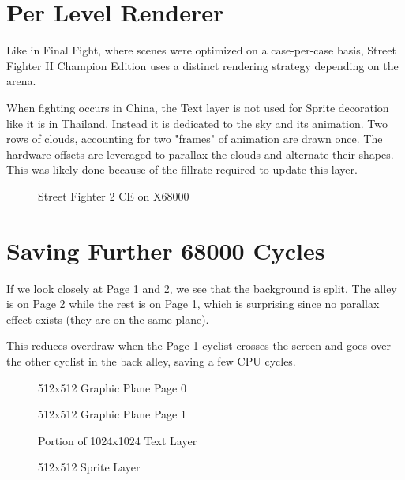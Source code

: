 \section{Per Level Renderer}
Like in Final Fight, where scenes were optimized on a case-per-case basis, Street Fighter II Champion Edition uses a distinct rendering strategy depending on the arena.

When fighting occurs in China, the Text layer is not used for Sprite decoration like it is in Thailand. Instead it is dedicated to the sky and its animation. Two rows of clouds, accounting for two "frames" of animation are drawn once. The hardware offsets are leveraged to parallax the clouds and alternate their shapes. This was likely done because of the fillrate required to update this layer.



\begin{figure}[H]
\caption*{Street Fighter 2 CE on X68000}
\end{figure}


\section{Saving Further 68000 Cycles}
If we look closely at Page 1 and 2, we see that the background is split. The alley is on Page 2 while the rest is on Page 1, which is surprising since no parallax effect exists (they are on the same plane). 

This reduces overdraw when the Page 1 cyclist crosses the screen and goes over the other cyclist in the back alley, saving a few CPU cycles.

\begin{minipage}[t]{0.49\linewidth}
\setlength{\intextsep}{0pt}
\begin{figure}[H]
\caption*{512x512 Graphic Plane Page 0}
\end{figure}
\end{minipage}%
\hfill
\begin{minipage}[t]{0.49\linewidth}
\setlength{\intextsep}{0pt}
  \begin{figure}[H]
  \caption*{512x512 Graphic Plane Page 1}
  \end{figure}
\end{minipage}%

\begin{minipage}[t]{0.49\linewidth}
  \begin{figure}[H]
  \caption*{Portion of 1024x1024 Text Layer}
  \end{figure}
\end{minipage}%
\hfill
\begin{minipage}[t]{0.49\linewidth}
   \begin{figure}[H]
  \caption*{512x512 Sprite Layer}
  \end{figure}
\end{minipage}%



